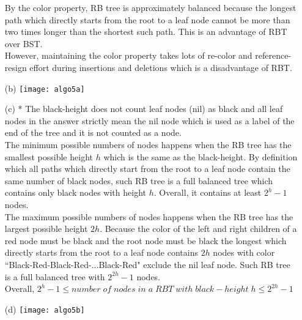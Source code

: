 \documentclass[10pt,twoside,a4paper]{article}
\begin{document}
\begin{itemize}
By the color property, RB tree is approximately balanced because the longest path which directly starts from the root to a leaf node cannot be more than two times longer than the shortest such path. This is an advantage of RBT over BST.
\\However, maintaining the color property takes lots of re-color and reference-resign effort during insertions and deletions which is a disadvantage of RBT.
\item[(b)]
\texttt{[image: algo5a]} 
\item[(c)]
* The black-height does not count leaf nodes (nil) as black and all leaf nodes in the answer strictly mean the nil node which is used as a label of the end of the tree and it is not counted as a node.
\\The minimum possible numbers of nodes happens when the RB tree has the smallest possible height $h$ which is the same as the black-height. By definition which all paths which directly start from the root to a leaf node contain the same number of black nodes, such RB tree is a full balanced tree which contains only black nodes with height $h$. Overall, it contains at least $2^h-1$ nodes.
\\The maximum possible numbers of nodes happens when the RB tree has the largest possible height $2h$. Because the color of the left and right children of a red node must be black and the root node must be black the longest which directly starts from the root to a leaf node contains $2h$ nodes with color ``Black-Red-Black-Red-...Black-Red" exclude the nil leaf node. Such RB tree is a full balanced tree with $2^{2h}-1$ nodes.
\\Overall, $2^h-1 \leq number\; of\; nodes\; in\; a\; RBT\; with\; black-height\; h \leq 2^{2h}-1$
\item[(d)]
\texttt{[image: algo5b]} 


\end{itemize}
\end{document}
